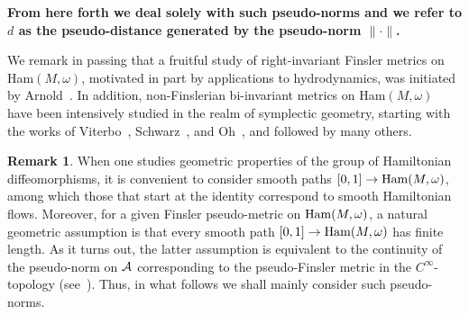 \documentclass{icmart}
\theoremstyle{definition}
\newtheorem{remark}[theorem]{Remark}
\begin{document}
\smallskip


{\bf From here forth we  deal solely with such pseudo-norms
and we  refer to $d$
as the pseudo-distance generated by the pseudo-norm $\| \cdot \|$. }


\smallskip


We remark in passing that
a fruitful study of right-invariant Finsler metrics on
Ham$(M,\omega)$, motivated in part by applications to hydrodynamics,
was initiated  by Arnold~\cite{Ar}. %
In addition, non-Finslerian bi-invariant metrics on Ham$(M,\omega)$ have been
intensively studied in the realm of symplectic geometry, starting
with the works of Viterbo~\cite{V1}, Schwarz~\cite{Sch}, and
Oh~\cite{Oh}, and followed by many others. %
\begin{remark} \label{Rmk-about-continuity} {\rm
When one studies  geometric properties of the group of
Hamiltonian diffeomorphisms, it is convenient to consider smooth
paths $ [0,1] \rightarrow {\rm Ham}(M,\omega) $, among which those
that start at the identity correspond to smooth Hamiltonian flows.
Moreover, for a given Finsler pseudo-metric on $ {\rm Ham}(M,\omega)$, a natural geometric assumption is that every
smooth path $ [0,1] \rightarrow {\rm Ham}(M,\omega) $ has finite
length. As it turns out,  the latter 
assumption is equivalent to the
continuity of the pseudo-norm on ${\cal A}$ corresponding to the
pseudo-Finsler metric in the $ C^{\infty} $-topology (see~\cite{BO}).
Thus, in what follows %
we shall mainly consider such pseudo-norms.}
 \end{remark}
\end{document}

